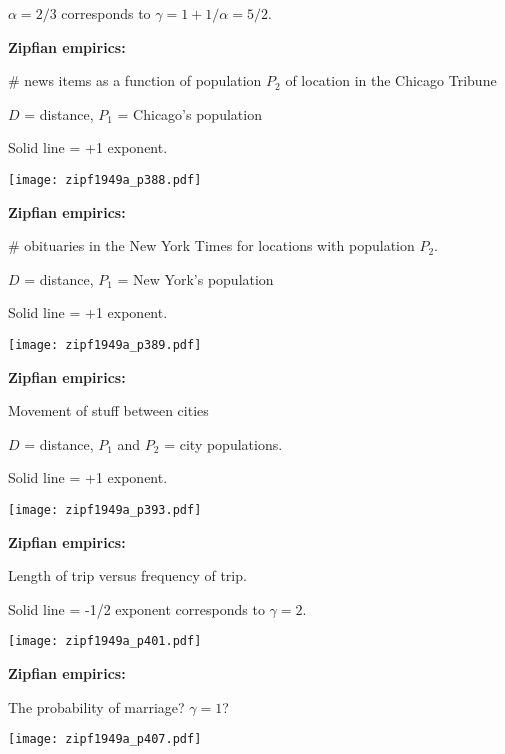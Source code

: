    $\alpha=2/3$ corresponds to $\gamma=1+1/\alpha=5/2$.
  



  \textbf{Zipfian empirics:}

  
   
    \# news items as a function of population $P_2$ of location
    in the Chicago Tribune 
  
    $D$ = distance, $P_1$ = Chicago's population
  
    Solid line = +1 exponent.
  
  \begin{center}
    \texttt{[image: zipf1949a\_p388.pdf]}
  \end{center}


  \textbf{Zipfian empirics:}

  
   
    \# obituaries in the New York Times for locations
    with population $P_2$.
  
    $D$ = distance, $P_1$ = New York's population
  
    Solid line = +1 exponent.
  
  \begin{center}
    \texttt{[image: zipf1949a\_p389.pdf]}
  \end{center}



  \textbf{Zipfian empirics:}

  
   
    Movement of stuff between cities
  
    $D$ = distance, $P_1$ and $P_2$ = city populations.
  
    Solid line = +1 exponent.
  

  \centering
  \texttt{[image: zipf1949a\_p393.pdf]}


  \textbf{Zipfian empirics:}

  
   
    Length of trip versus frequency of trip.
  
    Solid line = -1/2 exponent corresponds to $\gamma = 2$.
  
  \texttt{[image: zipf1949a\_p401.pdf]}


  \textbf{Zipfian empirics:}

  
   The probability of marriage?
   $\gamma = 1$?
  
  \begin{center}
    \texttt{[image: zipf1949a\_p407.pdf]}
  \end{center}


